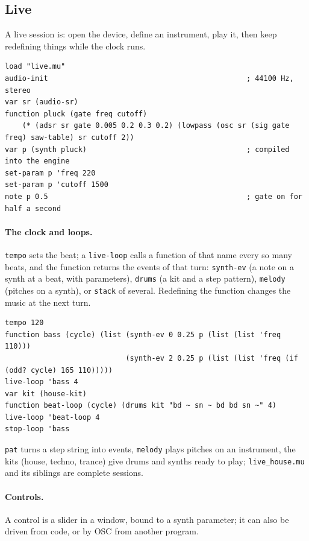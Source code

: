 \documentclass[11pt,a4paper]{article}
\newcommand{\musil}[1]{\lstinline[style=musilinline]{#1}}
\begin{document}
\subsection{Live}
\label{tut:live}

A live session is: open the device, define an instrument, play it, then keep redefining
things while the clock runs.

\begin{lstlisting}
load "live.mu"
audio-init                                              ; 44100 Hz, stereo
var sr (audio-sr)
function pluck (gate freq cutoff)
    (* (adsr sr gate 0.005 0.2 0.3 0.2) (lowpass (osc sr (sig gate freq) saw-table) sr cutoff 2))
var p (synth pluck)                                     ; compiled into the engine
set-param p 'freq 220
set-param p 'cutoff 1500
note p 0.5                                              ; gate on for half a second
\end{lstlisting}

\paragraph{The clock and loops.} \musil{tempo} sets the beat; a \musil{live-loop} calls a
function of that name every so many beats, and the function returns the events of that
turn: \musil{synth-ev} (a note on a synth at a beat, with parameters), \musil{drums} (a kit
and a step pattern), \musil{melody} (pitches on a synth), or \musil{stack} of several.
Redefining the function changes the music at the next turn.

\begin{lstlisting}
tempo 120
function bass (cycle) (list (synth-ev 0 0.25 p (list (list 'freq 110)))
                            (synth-ev 2 0.25 p (list (list 'freq (if (odd? cycle) 165 110)))))
live-loop 'bass 4
var kit (house-kit)
function beat-loop (cycle) (drums kit "bd ~ sn ~ bd bd sn ~" 4)
live-loop 'beat-loop 4
stop-loop 'bass
\end{lstlisting}

\musil{pat} turns a step string into events, \musil{melody} plays pitches on an instrument,
the kits (house, techno, trance) give drums and synths ready to play; \texttt{live\_house.mu}
and its siblings are complete sessions.

\paragraph{Controls.} A control is a slider in a window, bound to a synth parameter; it
can also be driven from code, or by OSC from another program.
\end{document}
